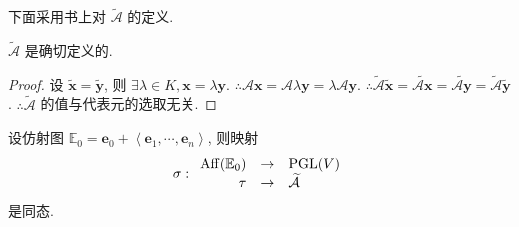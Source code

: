 \documentclass{ctexart}
\begin{document}
下面采用书上对 $\widetilde{\mathcal{A}}$ 的定义.
\begin{theorem}
    $\widetilde{\mathcal{A}}$ 是确切定义的.
\end{theorem}
\begin{proof}
    设 $\tilde{\boldsymbol{x}}=\tilde{\boldsymbol{y}}$, 则 $\exists\lambda\in K,\boldsymbol{x}=\lambda\boldsymbol{y}$. $\therefore\mathcal{A}\boldsymbol{x}=\mathcal{A}\lambda\boldsymbol{y}=\lambda\mathcal{A}\boldsymbol{y}$. $\therefore\widetilde{\mathcal{A}}\tilde{\boldsymbol{x}}=\widetilde{\mathcal{A}\boldsymbol{x}}=\widetilde{\mathcal{A}\boldsymbol{y}}=\widetilde{\mathcal{A}}\tilde{\boldsymbol{y}}$. $\therefore\widetilde{\mathcal{A}}$ 的值与代表元的选取无关.
\end{proof}
\begin{theorem}
    设仿射图 $\mathbb{E}_0=\boldsymbol{e}_0+\left<\boldsymbol{e}_1,\cdots,\boldsymbol{e}_n\right>$, 则映射
    \[\sigma:\begin{array}{rcl}
        \operatorname{Aff} (\mathbb{E}_0) & \to & \operatorname{PGL} (V) \\
        \tau & \to & \widetilde{\mathcal{A}} \\
    \end{array}\]
    是同态.
\end{theorem}
\end{document}
